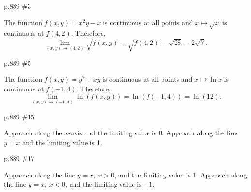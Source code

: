 \documentclass[11pt,oneside]{amsart}
\theoremstyle{definition}
\begin{document}
\begin{practice}p.889 \#3\end{practice}
\begin{pracsol}
  The function $f(x,y)=x^2y-x$ is continuous at all points and $x\mapsto\sqrt x$ is continuous at $f(4,2)$. Therefore,
  \[\lim_{(x,y)\mapsto (4,2)}\sqrt{f(x,y)}=\sqrt{f(4,2)}=\sqrt{28}=2\sqrt7.\]
\end{pracsol}
\begin{practice}p.889 \#5\end{practice}
\begin{pracsol}
  The function $f(x,y)=y^2+xy$ is continuous at all points and $x\mapsto \ln x$ is continuous at $f(-1,4)$. Therefore,
  \[\lim_{(x,y)\mapsto(-1,4)}\ln(f(x,y))=\ln(f(-1,4))=\ln(12).\]
\end{pracsol}
\begin{practice}p.889 \#15\end{practice}
\begin{pracsol}
  Approach along the $x$-axis and the limiting value is 0. Approach along the line $y=x$ and the limiting value is 1.
\end{pracsol}
\begin{practice}p.889 \#17\end{practice}
\begin{pracsol}
  Approach along the line $y=x,\ x>0$, and the limiting value is 1. Approach along the line $y=x,\ x<0$, and the limiting value is $-1$.
\end{pracsol}
\end{document}
